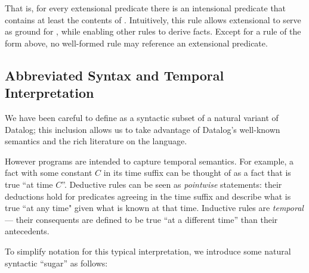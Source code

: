 
That is, for every extensional predicate  there is an intensional
predicate  that contains at least the contents of .
Intuitively, this rule allows extensional to serve as ground for
, while enabling other rules to derive  facts.
Except for a rule of the form above, no well-formed \slang rule may reference
an extensional predicate. 


\subsection{Abbreviated Syntax and Temporal Interpretation}
\label{sec:abbrvsyntax}

We have been careful to define \slang as a syntactic subset of a natural
variant of Datalog; this inclusion allows us to take advantage of Datalog's
well-known semantics and the rich literature on the language.

However \slang programs are intended to capture 
temporal semantics.  For example, a fact with some constant $C$ in its time
suffix can be thought of as a fact that is true ``at time $C$''.  
Deductive rules can be seen as {\em pointwise} statements: their deductions hold for 
predicates agreeing in the time suffix and describe what is true ``at any time" given 
what is known at that time.
 Inductive %
 rules are {\em temporal} --- their consequents are defined to
be true ``at a different time'' than their antecedents. 



To simplify \slang notation for this typical interpretation,  we introduce
some natural syntactic ``sugar'' as follows:

